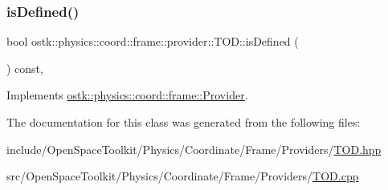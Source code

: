 \subsubsection{\texorpdfstring{is\+Defined()}{isDefined()}}
{\footnotesize\ttfamily bool ostk\+::physics\+::coord\+::frame\+::provider\+::\+T\+O\+D\+::is\+Defined (\begin{DoxyParamCaption}{ }\end{DoxyParamCaption}) const\hspace{0.3cm}{\ttfamily [override]}, {\ttfamily [virtual]}}



Implements \hyperlink{classostk_1_1physics_1_1coord_1_1frame_1_1_provider_a27acab0012649796b97956fed1a91493}{ostk\+::physics\+::coord\+::frame\+::\+Provider}.



The documentation for this class was generated from the following files\+:\begin{DoxyCompactItemize}
\item 
include/\+Open\+Space\+Toolkit/\+Physics/\+Coordinate/\+Frame/\+Providers/\hyperlink{_t_o_d_8hpp}{T\+O\+D.\+hpp}\item 
src/\+Open\+Space\+Toolkit/\+Physics/\+Coordinate/\+Frame/\+Providers/\hyperlink{_t_o_d_8cpp}{T\+O\+D.\+cpp}\end{DoxyCompactItemize}
